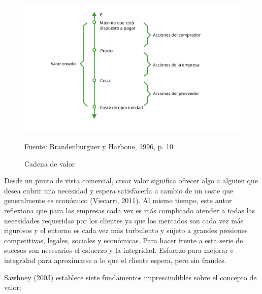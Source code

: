 \begin{figure}[!h]
	\caption{Cadena de valor}
	\centering \includegraphics[width=150mm]{capitulos/graficos/cadenaValor}
	\label{fig:cadenaValor}

		\footnotesize
		Fuente: Brandenburguer y Harbone, 1996, p. 10
\end{figure}

Desde un punto de vista comercial, crear valor significa ofrecer algo a alguien que desea cubrir una necesidad y espera satisfacerla a cambio de un coste que generalmente es económico (Viscarri, 2011). Al mismo tiempo, este autor reflexiona que para las empresas cada vez es más complicado atender a todas las necesidades requeridas por los clientes ya que los mercados son cada vez más rigurosos y el entorno es cada vez más turbulento y sujeto a grandes presiones competitivas, legales, sociales y económicas. Para hacer frente a esta serie de sucesos son necesarios el esfuerzo y la integridad. Esfuerzo para mejorar e integridad para aproximarse a lo que el cliente espera, pero sin fraudes.

Sawhney (2003) establece siete fundamentos imprescindibles sobre el concepto de valor:

